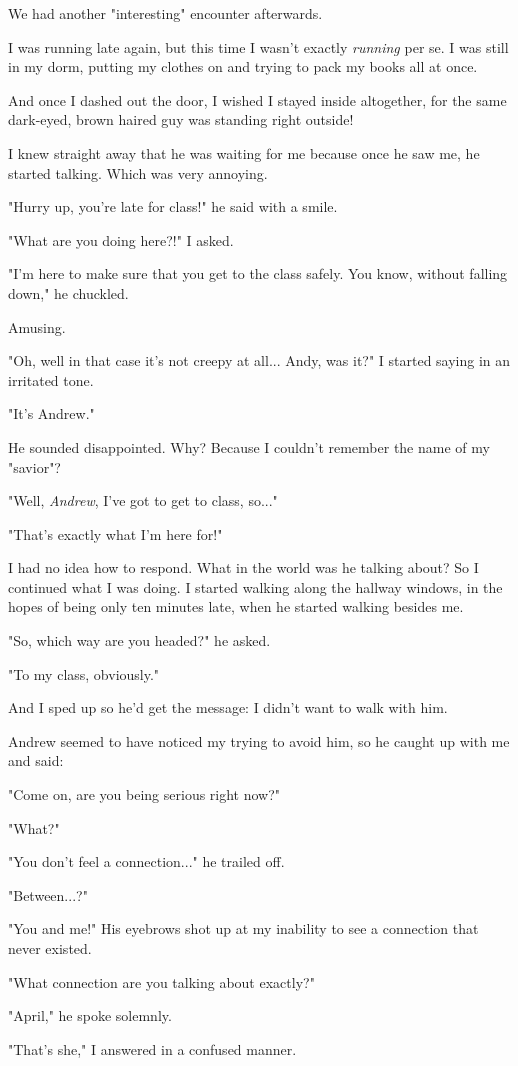 We had another "interesting" encounter afterwards.

I was running late again, but this time I wasn't exactly \textit{running} per se. I was still in my dorm, putting my clothes on and trying to pack my books all at once.

And once I dashed out the door, I wished I stayed inside altogether, for the same dark-eyed, brown haired guy was standing right outside!

I knew straight away that he was waiting for me because once he saw me, he started talking. Which was very annoying.

"Hurry up, you're late for class!" he said with a smile.

"What are you doing here?!" I asked.

"I'm here to make sure that you get to the class safely. You know, without falling down," he chuckled.

Amusing.

"Oh, well in that case it's not creepy at all... Andy, was it?" I started saying in an irritated tone.

"It's Andrew."

He sounded disappointed. Why? Because I couldn't remember the name of my "savior"?

"Well, \textit{Andrew}, I've got to get to class, so..."

"That's exactly what I'm here for!"

I had no idea how to respond. What in the world was he talking about? So I continued what I was doing. I started walking along the hallway windows, in the hopes of being only ten minutes late, when he started walking besides me.

"So, which way are you headed?" he asked.

"To my class, obviously."

And I sped up so he'd get the message: I didn't want to walk with him.

Andrew seemed to have noticed my trying to avoid him, so he caught up with me and said:

"Come on, are you being serious right now?"

"What?"

"You don't feel a connection..." he trailed off.

"Between...?"

"You and me!" His eyebrows shot up at my inability to see a connection that never existed.

"What connection are you talking about exactly?"

"April," he spoke solemnly.

"That's she," I answered in a confused manner.
